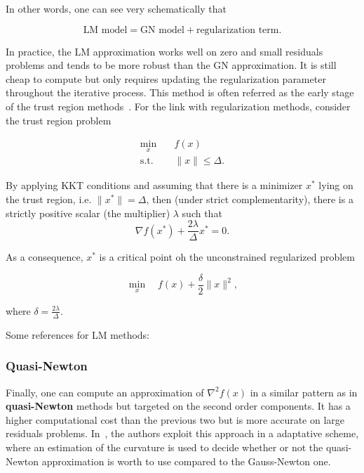\documentclass[10pt]{article}
\numberwithin{equation}{section}
\begin{document}
	 In other words, one can see very schematically that
	 
	\[\text{LM model} = \text{GN model} + \text{regularization term}.\]
	
	In practice, the LM approximation works well on zero and small residuals problems and tends to be more robust than the GN approximation. It is still cheap to compute but only requires updating the regularization parameter throughout the iterative process. This method is often referred as the early stage of the trust region methods~\cite{conn-etal:2000}. For the link with regularization methods, consider the trust region problem
	 
	 \begin{equation*}
	 	\begin{aligned}
	 		\min_x \quad & f(x) \\
	 		\text{s.t.} \quad & \|x\| \le \Delta.
	 	\end{aligned}
	 \end{equation*}
	 
	 By applying KKT conditions and assuming that there is a minimizer $x^*$ lying on the trust region, i.e. $\|x^*\|=\Delta$, then (under strict complementarity), there is a strictly positive scalar (the multiplier) $\lambda$ such that
	 \[\nabla f(x^*) + \dfrac{2\lambda}{\Delta}x^*=0.\]
	 
	 As a consequence, $x^*$ is a critical point oh the unconstrained regularized problem
	 
	 \[\min_x \quad f(x) + \dfrac{\delta}{2} \|x\|^2,\]
	 
	 where $\delta=\frac{2\lambda}{\Delta}$.
	 
	 Some references for LM methods: \cite{bellavia-etal:2018}
	 
	 \subsubsection{Quasi-Newton}
	 
	 Finally, one can compute an approximation of $\nabla^2f(x)$ in a similar pattern as in \textbf{quasi-Newton} methods \cite[][Chapter 6]{nocedalwright:2006} but targeted on the second order components. It has a higher computational cost than the previous two but is more accurate on large residuals problems. In~\cite{dennisetal:1981}, the authors exploit this approach in a adaptative scheme, where an estimation of the curvature is used to decide whether or not the quasi-Newton approximation is worth to use compared to the Gauss-Newton one.
	 
\end{document}
